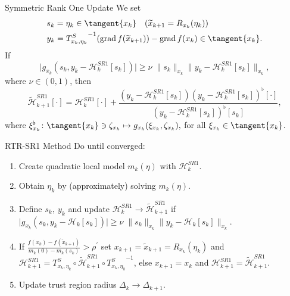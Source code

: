 \documentclass{beamer}
\begin{document}
\begin{frame}{Symmetric Rank One Update}
    We set
    \begin{align*}
        & s_k = \eta_k \in \tangent{x_k} \quad (\widetilde{x}_{k+1} = R_{x_k}(\eta_k))\\
        & y_k = {T^{S}_{x_k, \eta_k}}^{-1} ( \operatorname{grad}f(\widetilde{x}_{k+1}) ) - \operatorname{grad}f(x_k) \in \tangent{x_k}.
    \end{align*}
    If 
    \begin{equation*}
        \lvert g_{x_k}(s_k, y_k - \mathcal{H}^{SR1}_k[s_k]) \rvert \geq \nu \; \lVert s_k \rVert_{x_k} \lVert y_k - \mathcal{H}^{SR1}_k[s_k] \rVert_{x_k},
    \end{equation*}
    where $\nu \in (0,1)$, then
    \begin{equation*}
        \widetilde{\mathcal{H}}^{SR1}_{k+1} [\cdot] = \mathcal{H}^{SR1}_k [\cdot] + \frac{(y_k - \mathcal{H}^{SR1}_k [s_k]) (y_k - \mathcal{H}^{SR1}_k [s_k])^{\flat} [\cdot] }{(y_k - \mathcal{H}^{SR1}_k [s_k])^{\flat} [s_k]},
    \end{equation*}
    where $\xi^{\flat}_{x_k} \colon \tangent{x_k} \ni \zeta_{x_k} \mapsto g_{x_k}(\xi_{x_k}, \zeta_{x_k}),$ for all $\xi_{x_k} \in \tangent{x_k}$.
\end{frame}

\begin{frame}{RTR-SR1 Method}
    Do until converged:
    \begin{enumerate}
        \item Create quadratic local model $m_k(\eta)$ with $\mathcal{H}^{SR1}_k$. \\[0.2\baselineskip]
        \item Obtain $\eta_k$ by (approximately) solving $m_k(\eta)$. \\[0.2\baselineskip]
        \item Define $s_k, \ y_k$ and update $\mathcal{H}^{SR1}_k \rightarrow \widetilde{\mathcal{H}}^{SR1}_{k+1}$ if $\lvert g_{x_k}(s_k, y_k - \mathcal{H}_k[s_k]) \rvert \geq \nu \; \lVert s_k \rVert_{x_k} \lVert y_k - \mathcal{H}_k[s_k] \rVert_{x_k}$. \\[0.2\baselineskip]
        \item If $\frac{f(x_k) - f(\widetilde{x}_{k+1})}{m_k(0) - m_k(s_k)} > \rho^{\prime}$ set $x_{k+1} = \widetilde{x}_{k+1} = R_{x_k}(\eta_k)$ and $\mathcal{H}^{SR1}_{k+1} = T^{S}_{x_k, \eta_k} \circ \widetilde{\mathcal{H}}^{SR1}_{k+1} \circ  {T^{S}_{x_k, \eta_k}}^{-1}$, else $x_{k+1} = x_k$ and $\mathcal{H}^{SR1}_{k+1} = \widetilde{\mathcal{H}}^{SR1}_{k+1}$.\\[0.2\baselineskip]
        \item Update trust region radius $\Delta_k \rightarrow \Delta_{k+1}$.
    \end{enumerate}
\end{frame}
\end{document}
